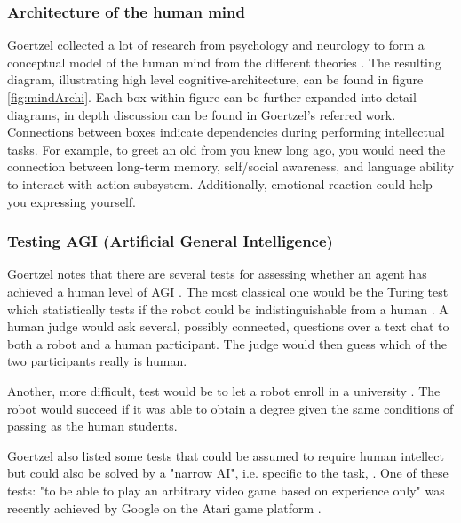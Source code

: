 \documentclass[11pt]{article}
\newenvironment{sketch}{\color{dark-green-2}}{\ignorespacesafterend}
\begin{document}
\subsubsection*{Architecture of the human mind}
Goertzel collected a lot of research from psychology and neurology to form a conceptual model of the human mind from the different theories \cite{goertzel2012agi}.  The resulting diagram, illustrating high level cognitive-architecture, can be found in figure \ref{fig:mindArchi}.
Each box within figure can be further expanded into detail diagrams, in depth discussion can be found in Goertzel's referred work. Connections between boxes indicate dependencies during performing intellectual tasks. For example, to greet an old from you knew long ago, you would need the connection between long-term memory, self/social awareness, and language ability to interact with action subsystem. Additionally, emotional reaction could help you expressing yourself. 




\subsubsection*{Testing AGI (Artificial General Intelligence)}
Goertzel notes that there are several tests for assessing whether an agent has achieved a human level of AGI \cite{goertzel2012agi}. The most classical one would be the Turing test which statistically tests if the robot could be indistinguishable from a human \cite{turing1950computing}. A human judge would ask several, possibly connected, questions over a text chat to both a robot and a human participant. The judge would then guess which of the two participants really is human.

Another, more difficult, test would be to let a robot enroll in a university \cite{goertzel2012agi}. The robot would succeed if it was able to obtain a degree given the same conditions of passing as the human students.

Goertzel also listed some tests that could be assumed to require human intellect but could also be solved by a "narrow AI", i.e. specific to the task, \cite{goertzel2012agi}. One of these tests: "to be able to play an arbitrary video game based on experience only" was recently achieved by Google on the Atari game platform \cite{googleAtari}.
\end{document}
